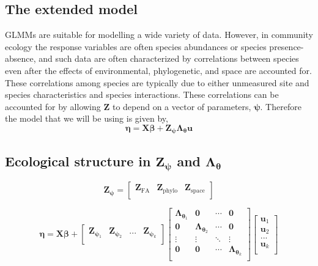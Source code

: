 \documentclass{article}
\begin{document}
\subsection{The extended model}

GLMMs are suitable for modelling a wide variety of data.  However, in
community ecology the response variables are often species abundances
or species presence-absence, and such data are often characterized by
correlations between species even after the effects of environmental,
phylogenetic, and space are accounted for.  These correlations among
species are typically due to either unmeasured site and species
characteristics and species interactions.  These correlations can be
accounted for by allowing $\bm Z$ to depend on a vector of parameters,
$\bm\psi$.  Therefore the model that we will be using is given by,
\begin{equation}
  \label{eq:6}
  \bm\eta = \bm X\bm\beta + \bm Z_{\bm\psi}\bm\Lambda_{\bm\theta}\bm u
\end{equation}

\subsection{Ecological structure in $\bm Z_{\bm\psi}$ and
  $\bm\Lambda_{\bm\theta}$}

\begin{equation}
  \label{eq:11}
  \bm Z_{\bm\psi} =
  \begin{bmatrix}
    \bm Z_{\mathrm{FA}} & \bm Z_{\mathrm{phylo}} & \bm
    Z_{\mathrm{space}} \\
  \end{bmatrix}
\end{equation}

\begin{equation}
  \label{eq:9}
  \bm\eta = \bm X\bm\beta + 
  \begin{bmatrix}
    \bm Z_{\bm\psi_1} & \bm Z_{\bm\psi_2} & ... & \bm Z_{\bm\psi_k} \\
  \end{bmatrix}
  \begin{bmatrix}
    \bm\Lambda_{\bm\theta_1} & \bm 0 & \cdots & \bm 0 \\
    \bm 0 & \bm\Lambda_{\bm\theta_2} & \cdots & \bm 0 \\
    \vdots   & \vdots & \ddots & \vdots \\
    \bm 0 & \bm 0 & \cdots & \bm\Lambda_{\bm\theta_k} \\
  \end{bmatrix}
  \begin{bmatrix}
    \bm u_1 \\ \bm u_2 \\ ... \\ \bm u_k \\
  \end{bmatrix}
\end{equation}
\end{document}
